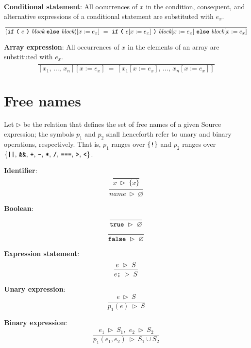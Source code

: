\vspace{10mm}
\textbf{Conditional statement}: All occurrences of $x$ in the condition, consequent, and alternative expressions of a conditional statement are substituted with $e_x$.
\[
\frac{
}{
  (
  \textbf{\texttt{if}}\ 
  \textbf{\texttt{(}}\ 
  e \ 
  \textbf{\texttt{)}} \ 
  \textit{block} \
  \textbf{\texttt{else}} \ 
  \textit{block}
  )[x := e_x]
  \ = \ 
  \textbf{\texttt{if}}\ 
  \textbf{\texttt{(}}\ 
  e[x := e_x] \ 
  \textbf{\texttt{)}} \ 
  \textit{block}[x := e_x] \
  \textbf{\texttt{else}} \ 
  \textit{block}[x := e_x]
}
\]

\vspace{10mm}
\textbf{Array expression}: All occurrences of $x$ in the elements of an array are substituted with $e_x$.
\[
\frac{
}{
  [x_1 \text{, } \ldots \text{, } x_n][x := e_x]
  \ = \ 
  [x_1[x := e_x] \text{, } \ldots \text{, } x_n[x := e_x]]
}
\]

\pagebreak
\section*{Free names}

Let $\rhd$ be the relation that defines the set of free names of a given Source expression; the symbols $p_1$ and $p_2$ shall henceforth refer to unary and binary operations, respectively. That is, $p_1$ ranges over $\{\textbf{\texttt{!}}\}$ and $p_2$ ranges over $\{\textbf{\texttt{||}},\, \textbf{\texttt{\&\&}},\, \textbf{\texttt{+}},\, \textbf{\texttt{-}},\, \textbf{\texttt{*}},\, \textbf{\texttt{/}},\, \textbf{\texttt{===}},\, \textbf{\texttt{>}},\, \textbf{\texttt{<}}\}$.

\vspace{10mm}
\textbf{Identifier}:
\[
\frac{
}{  
  x
  \ \rhd \
  \{x\}
}
\]
\[
\frac{
}{  
  \textit{name}
  \ \rhd \
  \varnothing
}
\]

\vspace{10mm}
\textbf{Boolean}:
\[
\frac{
}{  
  \textbf{\texttt{true}}
  \ \rhd \
  \varnothing
}
\]
\[
\frac{
}{  
  \textbf{\texttt{false}}
  \ \rhd \
  \varnothing
}
\]

\vspace{10mm}
\textbf{Expression statement}:
\[
\frac{
  e \ \rhd \ S
}{  
  e \textbf{\texttt{;}} \ \rhd \ S
}
\]

\vspace{10mm}
\textbf{Unary expression}:
\[
\frac{
  e \ \rhd \ S
}{  
  p_1(e) \ \rhd \ S
}
\]

\vspace{10mm}
\textbf{Binary expression}:
\[
\frac{
  e_1 \ \rhd \ S_1
  \text{, } \
  e_2 \ \rhd \ S_2
}{  
  p_1(e_1, e_2)
  \ \rhd \
  S_1 \cup S_2
}
\]

